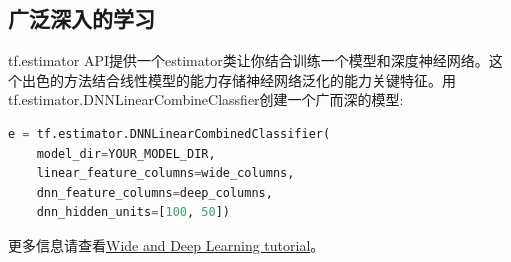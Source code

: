 \subsection{广泛深入的学习}
tf.estimator API提供一个estimator类让你结合训练一个模型和深度神经网络。这个出色的方法结合线性模型的能力存储神经网络泛化的能力关键特征。用tf.estimator.DNNLinearCombineClassfier创建一个广而深的模型:
\begin{lstlisting}[language=Python]
e = tf.estimator.DNNLinearCombinedClassifier(
    model_dir=YOUR_MODEL_DIR,
    linear_feature_columns=wide_columns,
    dnn_feature_columns=deep_columns,
    dnn_hidden_units=[100, 50])
\end{lstlisting}
更多信息请查看\href{https://www.tensorflow.org/tutorials/wide_and_deep}{Wide and Deep Learning tutorial}。